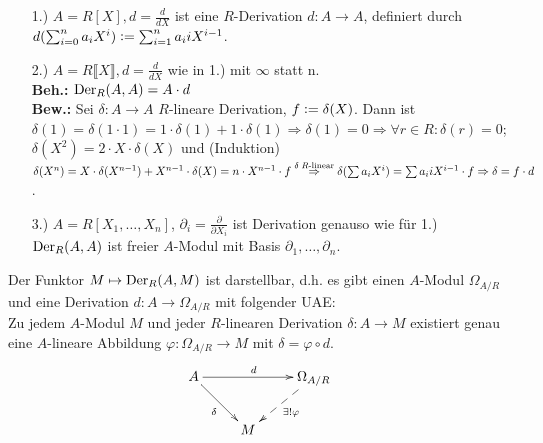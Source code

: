 \documentclass[a4paper, 10pt]{report}
\begin{document}
\begin{nnBsp}
  \begin{enumerate}
    \item[1.)] $A = R[X], d = \frac{d}{dX}$ ist eine $R$-Derivation $d: A \to
               A$, definiert durch $d(\sum_{i=0}^n a_i X^i) \mathrel{\mathop:}= \sum_{i=1}^n a_i
               i X^{i-1}$.
    \item[2.)] $A = R \llbracket X \rrbracket, d = \frac{d}{dX}$ wie in 1.) mit
               $\infty$ statt n.\\
               \textbf{Beh.:} $\Der[R]{A}{A} = A \cdot d$\\
               \textbf{Bew.:} Sei $\delta: A \to A$ $R$-lineare Derivation, $f
               \mathrel{\mathop:}= \delta(X)$. Dann ist $\delta(1) = \delta(1 \cdot 1) =1 
               \cdot \delta(1) + 1 \cdot \delta(1) \Rightarrow \delta(1) = 0
               \Rightarrow \forall r \in R:\delta(r) = 0$; $\delta(X^2) = 2
               \cdot X \cdot \delta(X)$ und (Induktion) $\delta(X^n) = X \cdot
               \delta(X^{n-1}) + X^{n-1} \cdot \delta(X) = n \cdot X^{n-1}\cdot
               f \overset{\delta\; R\text{\scriptsize -linear}}{\Rightarrow}
               \delta(\sum a_i X^i) = \sum a_i i X^{i-1} \cdot f \Rightarrow
               \delta = f \cdot d$.
    \item[3.)] $A = R[X_1,\dots,X_n]$, $\partial_i = \frac{\partial}{\partial
               X_i}$ ist Derivation genauso wie für 1.)\\
               $\Der[R]{A}{A}$ ist freier $A$-Modul mit Basis $\partial_1,
               \dots , \partial_n$.
  \end{enumerate}
\end{nnBsp}

\begin{PropDef}
\label{1.21}
  Der Funktor $M \mapsto \Der[R]{A}{M}$ ist \glqq darstellbar\grqq, d.h. es
  gibt
  einen $A$-Modul $\Omega_{A/R}$ und eine Derivation $d: A \to \Omega_{A/R}$ mit
  folgender UAE:\\
  Zu jedem $A$-Modul $M$ und jeder $R$-linearen Derivation $\delta: A \to M$
  existiert genau eine $A$-lineare Abbildung $\varphi: \Omega_{A/R} \to M$ mit
  $\delta = \varphi \circ d$.
  \[
    \begin{xy}
      \xymatrix{
         A \ar[rr]^{d} \ar[rd]_{\delta}  &     &  \Omega_{A/R} \ar@{-->}[dl]^{\exists!\varphi}  \\
                                         &  M  &
      }
    \end{xy}
  \]
\end{PropDef}
\end{document}
